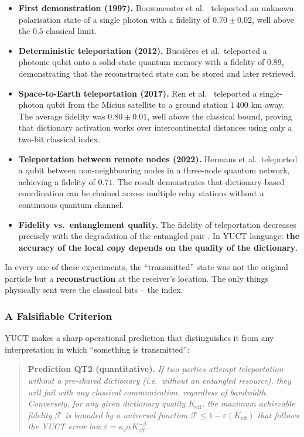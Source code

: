 \documentclass[12pt,a4paper]{article}
\theoremstyle{remark}
\begin{document}
	\begin{itemize}
		\item \textbf{First demonstration (1997).} Bouwmeester et al.\ \cite{Bouwmeester1997}
		teleported an unknown polarisation state of a single photon with a fidelity of
		$0.70 \pm 0.02$, well above the $0.5$ classical limit.
		\item \textbf{Deterministic teleportation (2012).} Bussi\`eres et al.\ teleported a
		photonic qubit onto a solid-state quantum memory with a fidelity of $0.89$,
		demonstrating that the reconstructed state can be stored and later retrieved.
		\item \textbf{Space-to-Earth teleportation (2017).} Ren et al.\ \cite{Ren2017}
		teleported a single-photon qubit from the Micius satellite to a ground station
		$1\,400$ km away. The average fidelity was $0.80 \pm 0.01$, well above the
		classical bound, proving that dictionary activation works over intercontinental
		distances using only a two-bit classical index.
		\item \textbf{Teleportation between remote nodes (2022).} Hermans et al.\ teleported a
		qubit between non-neighbouring nodes in a three-node quantum network, achieving a
		fidelity of $0.71$. The result demonstrates that dictionary-based coordination
		can be chained across multiple relay stations without a continuous quantum
		channel.
		\item \textbf{Fidelity vs.\ entanglement quality.} The fidelity of teleportation
		decreases precisely with the degradation of the entangled pair
		\cite{Knill2005}. In YUCT language: \textbf{the accuracy of the local copy
			depends on the quality of the dictionary}.
	\end{itemize}
	
	In every one of these experiments, the ``transmitted'' state was not the original particle
	but a \textbf{reconstruction} at the receiver's location. The only things physically sent
	were the classical bits -- the index.
	
	\subsubsection{A Falsifiable Criterion}
	
	YUCT makes a sharp operational prediction that distinguishes it from any interpretation
	in which ``something is transmitted'':
	
	\begin{quote}
		\textbf{Prediction QT2 (quantitative).} \emph{If two parties attempt teleportation
			without a pre-shared dictionary (i.e.\ without an entangled resource), they will fail
			with any classical communication, regardless of bandwidth. Conversely, for any given
			dictionary quality $K_{\mathrm{eff}}$, the maximum achievable fidelity
			$\mathcal{F}$ is bounded by a universal function
			$\mathcal{F} \le 1 - \varepsilon(K_{\mathrm{eff}})$ that follows the YUCT error law
			$\varepsilon = \kappa_c \alpha K_{\mathrm{eff}}^{-\beta}$.}
	\end{quote}
	
\end{document}
